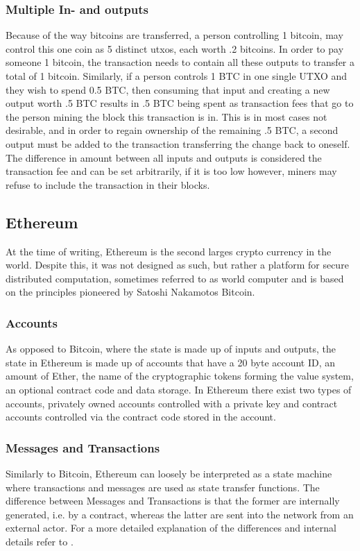 \documentclass[12pt,msc,a4paper,oneside]{ucl_thesis}
\begin{document}
\subsubsection{Multiple In- and outputs} \label{sec:background_bitcoin:multiple_in_out}
Because of the way bitcoins are transferred, a person controlling 1 bitcoin, may control this one coin as 5 distinct utxos, each worth .2 bitcoins. In order to pay someone 1 bitcoin, the transaction needs to contain all these outputs to transfer a total of 1 bitcoin. Similarly, if a person controls 1 BTC in one single UTXO and they wish to spend 0.5 BTC, then consuming that input and creating a new output worth .5 BTC results in .5 BTC being spent as transaction fees that go to the person mining the block this transaction is in. This is in most cases not desirable, and in order to regain ownership of the remaining .5 BTC, a second output must be added to the transaction transferring the change back to oneself. The difference in amount between all inputs and outputs is considered the transaction fee and can be set arbitrarily, if it is too low however, miners may refuse to include the transaction in their blocks. \cite{bitcoin:satoshi}


\subsection{Ethereum} \label{sec:background_ethereum}
At the time of writing, Ethereum is the second larges crypto currency in the world. Despite this, it was not designed as such, but rather a platform for secure distributed computation, sometimes referred to as world computer and is based on the principles pioneered by Satoshi Nakamotos Bitcoin. \cite{ethereum:vitalik_buterin} \cite{ethereum:gavin_wood}

\subsubsection{Accounts}
As opposed to Bitcoin, where the state is made up of inputs and outputs, the state in Ethereum is made up of accounts that have a 20 byte account ID, an amount of Ether, the name of the cryptographic tokens forming the value system, an optional contract code and data storage. In Ethereum there exist two types of accounts, privately owned accounts controlled with a private key and contract accounts controlled via the contract code stored in the account. \cite{ethereum:vitalik_buterin} \cite{ethereum:gavin_wood}

\subsubsection{Messages and Transactions}
Similarly to Bitcoin, Ethereum can loosely be interpreted as a state machine where transactions and messages are used as state transfer functions. The difference between Messages and Transactions is that the former are internally generated, i.e. by a contract, whereas the latter are sent into the network from an external actor. For a more detailed explanation of the differences and internal details refer to \cite{ethereum:gavin_wood}.
\end{document}
